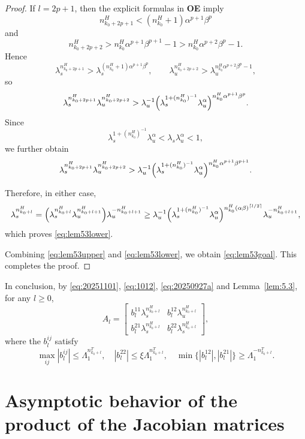 \documentclass{amsart}
\theoremstyle{plain}
\theoremstyle{definition}
\theoremstyle{remark}
\numberwithin{equation}{section}
\begin{document}
\begin{proof}
If $l=2p+1$, then the explicit formulas in {\bf OE} imply
\[
n_{k_0+2p+1}^H<(n_{k_0}^H+1)\alpha^{p+1}\beta^p
\]
and
\[
n_{k_0+2p+2}^H>n_{k_0}^H\alpha^{p+1}\beta^{p+1}-1
>n_{k_0}^H\alpha^{p+2}\beta^p-1.
\]
Hence
\[
\lambda_s^{n_{k_0+2p+1}^H}
>
\lambda_s^{(n_{k_0}^H+1)\alpha^{p+1}\beta^p},
\qquad
\lambda_u^{n_{k_0+2p+2}^H}
>
\lambda_u^{n_{k_0}^H\alpha^{p+2}\beta^p-1},
\]
so
\[
\lambda_s^{n_{k_0+2p+1}^H}\lambda_u^{n_{k_0+2p+2}^H}
>
\lambda_u^{-1}
\Bigl(\lambda_s^{1+(n_{k_0}^H)^{-1}}\lambda_u^{\alpha}\Bigr)^{n_{k_0}^H\alpha^{p+1}\beta^p}.
\]
Since
\[
\lambda_s^{1+(n_{k_0}^H)^{-1}}\lambda_u^{\alpha}
<
\lambda_s\lambda_u^{\alpha}
<
1,
\]
we further obtain
\[
\lambda_s^{n_{k_0+2p+1}^H}\lambda_u^{n_{k_0+2p+2}^H}
>
\lambda_u^{-1}
\Bigl(\lambda_s^{1+(n_{k_0}^H)^{-1}}\lambda_u^{\alpha}\Bigr)^{n_{k_0}^H\alpha^{p+1}\beta^{p+1}}.
\]

Therefore, in either case,
\[
\lambda_s^{n_{k_0+l}^H}
=
\Bigl(\lambda_s^{n_{k_0+l}^H}\lambda_u^{n_{k_0+l+1}^H}\Bigr)\lambda_u^{-n_{k_0+l+1}^H}
\ge
\lambda_u^{-1}
\Bigl(\lambda_s^{1+(n_{k_0}^H)^{-1}}\lambda_u^{\alpha}\Bigr)^{n_{k_0}^H(\alpha\beta)^{\lceil l/2\rceil}}
\lambda_u^{-n_{k_0+l+1}^H},
\]
which proves \eqref{eq:lem53lower}.

Combining \eqref{eq:lem53upper} and \eqref{eq:lem53lower}, we obtain \eqref{eq:lem53goal}. This completes the proof.
\end{proof}

In conclusion, by \eqref{eq:20251101}, \eqref{eq:1012}, \eqref{eq:20250927a} and Lemma~\ref{lem:5.3},
for any $l\ge 0$,
\begin{equation}\label{eq:0412}
    A_l=\begin{bmatrix}
        b_l^{11}\lambda_s^{n_{k_0+l}^H} & b_l^{12}\lambda_u^{n_{k_0+l}^H}\\
        b_l^{21}\lambda_s^{n_{k_0+l}^H} & b_l^{22}\lambda_s^{n_{k_0+l}^H}
    \end{bmatrix},
\end{equation}
where the $b_l^{ij}$ satisfy
\begin{equation}\label{eq:1004a}
    \max_{ij}|b_l^{ij}|\le\Lambda_1^{n_{k_0+l}^T},\quad
    |b_l^{22}|\le\xi\Lambda_1^{n_{k_0+l}^T},\quad
    \min\{|b_l^{12}|,|b_l^{21}|\}\ge\Lambda_1^{-n_{k_0+l}^T}.
\end{equation}






\section{Asymptotic behavior of the product of the Jacobian matrices}\label{s:6}
\end{document}
